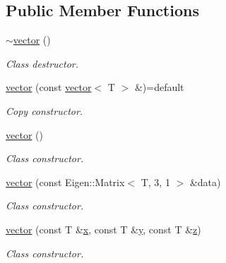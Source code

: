 \subsection*{Public Member Functions}
\begin{DoxyCompactItemize}
\item 
\mbox{\label{classddd_1_1vector_aa318607b6bdd556e5aa371488b3b2da8}} 
\hyperlink{classddd_1_1vector_aa318607b6bdd556e5aa371488b3b2da8}{$\sim$vector} ()
\begin{DoxyCompactList}\small\item\em Class destructor. \end{DoxyCompactList}\item 
\mbox{\label{classddd_1_1vector_a9e10641f3e361c24f5a9756bbd1b2d44}} 
\hyperlink{classddd_1_1vector_a9e10641f3e361c24f5a9756bbd1b2d44}{vector} (const \hyperlink{classddd_1_1vector}{vector}$<$ T $>$ \&)=default
\begin{DoxyCompactList}\small\item\em Copy constructor. \end{DoxyCompactList}\item 
\mbox{\label{classddd_1_1vector_a5231808b18bae0590e5083ff27b29056}} 
\hyperlink{classddd_1_1vector_a5231808b18bae0590e5083ff27b29056}{vector} ()
\begin{DoxyCompactList}\small\item\em Class constructor. \end{DoxyCompactList}\item 
\hyperlink{classddd_1_1vector_a5dec8f05a011372b6b2795827607e6b2}{vector} (const Eigen\+::\+Matrix$<$ T, 3, 1 $>$ \&data)
\begin{DoxyCompactList}\small\item\em Class constructor. \end{DoxyCompactList}\item 
\hyperlink{classddd_1_1vector_a90f097b576d026cb86b487546b841622}{vector} (const T \&\hyperlink{classddd_1_1vector_a1108468dc6ce04acf1d74949177c97b3}{x}, const T \&\hyperlink{classddd_1_1vector_a678928885fa7bcdb22f25eff71f74cdd}{y}, const T \&\hyperlink{classddd_1_1vector_a6f9a297e7ba387597ca0515421012166}{z})
\begin{DoxyCompactList}\small\item\em Class constructor. \end{DoxyCompactList}\item 

\end{DoxyCompactItemize}
